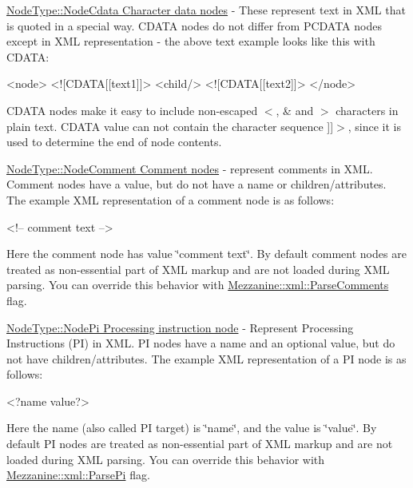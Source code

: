 \begin{DoxyItemize}
\item \hyperlink{namespaceMezzanine_1_1xml_a524d867e34ff408b8f45a51b7924cb80}{NodeType::NodeCdata Character data nodes} -\/ These represent text in XML that is quoted in a special way. CDATA nodes do not differ from PCDATA nodes except in XML representation -\/ the above text example looks like this with CDATA: 
\begin{DoxyCode}
 <node> <![CDATA[[text1]]> <child/> <![CDATA[[text2]]> </node> 
\end{DoxyCode}
 CDATA nodes make it easy to include non-\/escaped $<$, \& and $>$ characters in plain text. CDATA value can not contain the character sequence \mbox{]}\mbox{]}$>$, since it is used to determine the end of node contents. \par

\item \hyperlink{namespaceMezzanine_1_1xml_a524d867e34ff408b8f45a51b7924cb80}{NodeType::NodeComment Comment nodes} -\/ represent comments in XML. Comment nodes have a value, but do not have a name or children/attributes. The example XML representation of a comment node is as follows: 
\begin{DoxyCode}
 <!-- comment text --> 
\end{DoxyCode}
 Here the comment node has value \char`\"{}comment text\char`\"{}. By default comment nodes are treated as non-\/essential part of XML markup and are not loaded during XML parsing. You can override this behavior with \hyperlink{namespaceMezzanine_1_1xml_af7f6768222908469cd315b24c4095f4f}{Mezzanine::xml::ParseComments} flag. \par

\item \hyperlink{namespaceMezzanine_1_1xml_a524d867e34ff408b8f45a51b7924cb80}{NodeType::NodePi Processing instruction node} -\/ Represent Processing Instructions (PI) in XML. PI nodes have a name and an optional value, but do not have children/attributes. The example XML representation of a PI node is as follows: 
\begin{DoxyCode}
 <?name value?> 
\end{DoxyCode}
 Here the name (also called PI target) is \char`\"{}name\char`\"{}, and the value is \char`\"{}value\char`\"{}. By default PI nodes are treated as non-\/essential part of XML markup and are not loaded during XML parsing. You can override this behavior with \hyperlink{namespaceMezzanine_1_1xml_ab7885d16db7e01d710dffb803fc9a896}{Mezzanine::xml::ParsePi} flag. \par


\end{DoxyItemize}
